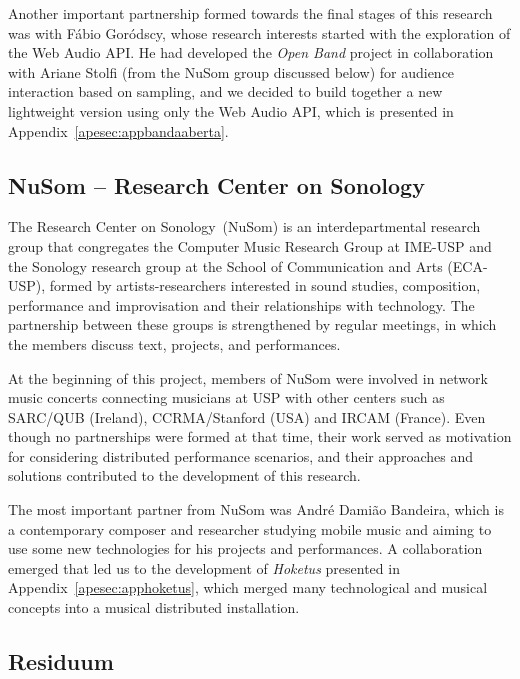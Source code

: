 Another important partnership formed towards the final stages of this research was with Fábio Goródscy, whose research interests started with the exploration of the Web Audio API.
He had developed the \textit{Open Band} project in collaboration with Ariane Stolfi (from the NuSom group discussed below) for audience interaction based on sampling, and we decided to build together a new lightweight version using only the Web Audio API, which is presented in Appendix~\ref{apesec:appbandaaberta}.

\subsection*{NuSom – Research Center on Sonology}

The Research Center on Sonology~(NuSom) is an interdepartmental research group that congregates the Computer Music Research Group at IME-USP and the Sonology research group at the School of Communication and Arts (ECA-USP), formed by artists-researchers interested in sound studies, composition,  performance and improvisation and their relationships with technology.
The partnership between these groups is strengthened by regular meetings, in which the members discuss text, projects, and performances.

At the beginning of this project, members of NuSom were involved in network music concerts connecting musicians at USP with other centers such as SARC/QUB (Ireland), CCRMA/Stanford (USA) and IRCAM (France).
Even though no partnerships were formed at that time, their work served as motivation for considering distributed performance scenarios, and their approaches and solutions contributed to the development of this research.

The most important partner from NuSom was André Damião Bandeira, which is a contemporary composer and researcher studying mobile music and aiming to use some new technologies for his projects and performances.
A collaboration emerged that led us to the development of \textit{Hoketus} presented in Appendix~\ref{apesec:apphoketus}, which merged many technological and musical concepts into a musical distributed installation.

\subsection*{Residuum}

